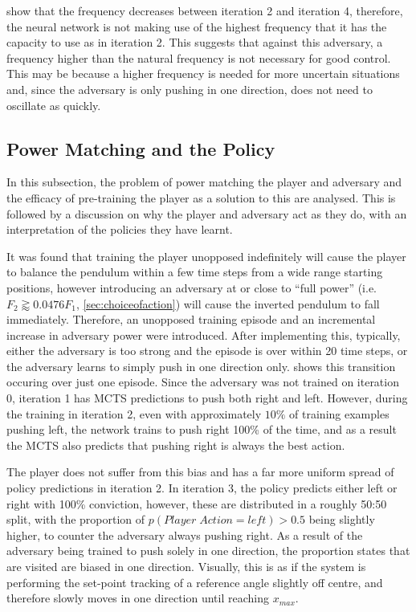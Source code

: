 \documentclass[../main.tex]{subfiles}
\begin{document}
 show that the frequency decreases between iteration 2 and iteration 4, therefore, the neural network is not making use of the highest frequency that it has the capacity to use as in iteration 2. This suggests that against this adversary, a frequency higher than the natural frequency is not necessary for good control. This may be because a higher frequency is needed for more uncertain situations and, since the adversary is only pushing in one direction, does not need to oscillate as quickly.

\subsection{Power Matching and the Policy}

In this subsection, the problem of power matching the player and adversary and the efficacy of pre-training the player as a solution to this are analysed. This is followed by a discussion on why the player and adversary act as they do, with an interpretation of the policies they have learnt.

It was found that training the player unopposed indefinitely will cause the player to balance the pendulum within a few time steps from a wide range starting positions, however introducing an adversary at or close to ``full power'' (i.e. $F_2  \gtrapprox  0.0476F_1$, \cref{sec:choiceofaction}) will cause the inverted pendulum to fall immediately. Therefore, an unopposed training episode and an incremental increase in adversary power were introduced. After implementing this, typically, either the adversary is too strong and the episode is over within 20 time steps, or the adversary learns to simply push in one direction only.  shows this transition occuring over just one episode. Since the adversary was not trained on iteration 0, iteration 1 has MCTS predictions to push both right and left. However, during the training in iteration 2, even with approximately $10\%$ of training examples pushing left, the network trains to push right 100\% of the time, and as a result the MCTS also predicts that pushing right is always the best action.

The player does not suffer from this bias and has a far more uniform spread of policy predictions in iteration 2. In iteration 3, the policy predicts either left or right with 100\% conviction, however, these are distributed in a roughly 50:50 split, with the proportion of $p(Player \; Action = left) > 0.5$ being slightly higher, to counter the adversary always pushing right. As a result of the adversary being trained to push solely in one direction, the proportion states that are visited are biased in one direction. Visually, this is as if the system is performing the set-point tracking of a reference angle slightly off centre, and therefore slowly moves in one direction until reaching $x_{max}$.
\end{document}
